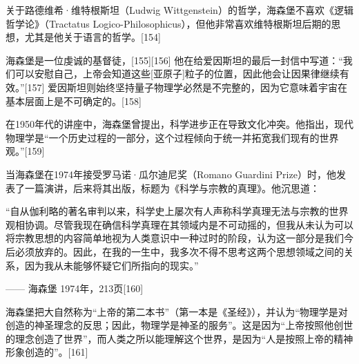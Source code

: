 关于路德维希·维特根斯坦（Ludwig Wittgenstein）的哲学，海森堡不喜欢《逻辑哲学论》（Tractatus Logico-Philosophicus），但他非常喜欢维特根斯坦后期的思想，尤其是他关于语言的哲学。[154]

海森堡是一位虔诚的基督徒，[155][156] 他在给爱因斯坦的最后一封信中写道：“我们可以安慰自己，上帝会知道这些[亚原子]粒子的位置，因此他会让因果律继续有效。”[157] 爱因斯坦则始终坚持量子物理学必然是不完整的，因为它意味着宇宙在基本层面上是不可确定的。[158]

在1950年代的讲座中，海森堡曾提出，科学进步正在导致文化冲突。他指出，现代物理学是“一个历史过程的一部分，这个过程倾向于统一并拓宽我们现有的世界观。”[159]  

当海森堡在1974年接受罗马诺·瓜尔迪尼奖（Romano Guardini Prize）时，他发表了一篇演讲，后来将其出版，标题为《科学与宗教的真理》。他沉思道：

“自从伽利略的著名审判以来，科学史上屡次有人声称科学真理无法与宗教的世界观相协调。尽管我现在确信科学真理在其领域内是不可动摇的，但我从未认为可以将宗教思想的内容简单地视为人类意识中一种过时的阶段，认为这一部分是我们今后必须放弃的。因此，在我的一生中，我多次不得不思考这两个思想领域之间的关系，因为我从未能够怀疑它们所指向的现实。”

—— 海森堡 1974年，213页[160]  

海森堡把大自然称为“上帝的第二本书”（第一本是《圣经》），并认为“物理学是对创造的神圣理念的反思；因此，物理学是神圣的服务”。这是因为“上帝按照他创世的理念创造了世界”，而人类之所以能理解这个世界，是因为“人是按照上帝的精神形象创造的”。[161]